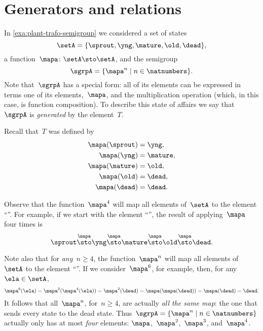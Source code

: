 
\section{Generators and relations}

In \cref{exa:plant-trafo-semigroup} we considered a set of states
%
\begin{equation}
	\setA= \{ \sprout, \yng, \mature, \old, \dead \},
\end{equation}
%
a function~$\mapa \colon \setA \sto \setA$, and the semigroup
%
\begin{equation}
	\label{eq:trafo-sgrp-one-gen}
	\sgrpA = \{ \mapa^n \mid n \in \natnumbers \}.
\end{equation}
%
Note that~$\sgrpA$ has a special form: all of its elements can be expressed in terms one of its elements,~$\mapa$, and the multiplication operation (which, in this case, is function composition).
To describe this state of affairs we say that~$\sgrpA$ is \emph{generated} by the element~$T$.

Recall that~$T$ was defined by
%
\begin{align*}
	\mapa(\sprout) & =  \yng,    \\
	\mapa(\yng)    & =  \mature, \\
	\mapa(\mature) & =  \old,    \\
	\mapa( \old)   & = \dead,    \\
	\mapa(\dead)   & = \dead.
\end{align*}

Observe that the function~$\mapa^4$ will map all elements of~$\setA$ to the element ``\dead''.
For example, if we start with the element ``\sprout'', the result of applying~$\mapa$ four times is
%
\begin{equation*}
	\sprout \overset{\mapa}{\sto} \yng \overset{\mapa}{\sto} \mature \overset{\mapa}{\sto} \old \overset{\mapa}{\sto} \dead.
\end{equation*}

Note also that for \emph{any}~$n \geq 4$, the function~$\mapa^n$ will map all elements of~$\setA$ to the element ``\dead''.
If we consider~$\mapa^6$, for example, then, for any~$\ela \in \setA$,
%
\begin{equation*}
	\mapa^6(\ela) = \mapa^2(\mapa^4(\ela)) = \mapa^2(\dead) = \mapa(\mapa(\dead)) = \mapa(\dead) = \dead.
\end{equation*}
%
It follows that all~$\mapa^n$, for~$n \geq 4$, are actually \emph{all the same map}: the one that sends every state to the dead state.
Thus~$\sgrpA = \{ \mapa^n \mid n \in \natnumbers \}$ actually only has at most \emph{four} elements: $\mapa$,~$\mapa^2$,~$\mapa^3$, and~$\mapa^4$.

